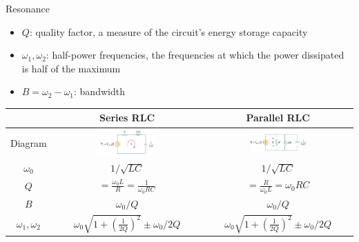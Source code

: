 \documentclass{beamer}
\begin{document}

\begin{frame}{Resonance}

\begin{itemize}
    \item $Q$: quality factor, a measure of the circuit's energy storage capacity
    \item $\omega_1, \omega_2$: half-power frequencies, the frequencies at which the power dissipated is half of the maximum
    \item $B = \omega_2 - \omega_1$: bandwidth
\end{itemize}

\begin{table}[]
    \centering
    \begin{tabular}{ccc}
        \toprule
       & Series RLC & Parallel RLC \\
       \midrule
       Diagram & 
       \includegraphics[width=0.4\textwidth]{C14/resonance1.png}
       & 
       \includegraphics[width=0.4\textwidth]{C14/resonance2.png}
       \\
        $\omega_0$ & $1/\sqrt{LC}$ & $1/\sqrt{LC}$ \\
        $Q$ & $=\frac{\omega_0L}{R}=\frac{1}{\omega_0RC}$ & $=\frac{R}{\omega_0L}=\omega_0RC$ \\
        $B$ & $\omega_0/Q$ & $\omega_0/Q$ \\
        $\omega_1, \omega_2$ & $\omega_0 \sqrt{1+(\frac{1}{2Q})^2} \pm \omega_0/2Q$ & $\omega_0 \sqrt{1+(\frac{1}{2Q})^2} \pm \omega_0/2Q$ \\
        \bottomrule
    \end{tabular}
\end{table}
    
\end{frame}

\end{document}
